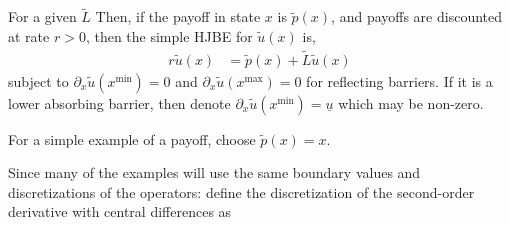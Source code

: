 \documentclass[11pt]{article}
\newcommand{\D}[1][]{\ensuremath{\partial_{#1}}}
\begin{document}
For a given $\tilde{L}$ Then, if the payoff in state $x$ is $\tilde{p}(x)$, and payoffs are discounted at rate $r > 0$, then the simple HJBE for $\tilde{u}(x)$ is,
\begin{align}
r \tilde{u}(x) &= \tilde{p}(x) + \tilde{L} \tilde{u}(x)\label{eq:general-stationary-HJBE}
\end{align}
subject to $\D[x]\tilde{u}(x^{\min}) = 0$ and $\D[x]\tilde{u}(x^{\max}) = 0$ for reflecting barriers.  If it is a lower absorbing barrier, then denote $\D[x]\tilde{u}(x^{\min}) = \underline{u}$ which may be non-zero.

For a simple example of a payoff, choose $\tilde{p}(x) = x$.

Since many of the examples will use the same boundary values and discretizations of the operators: define the discretization of the second-order derivative with central differences as
\end{document}
